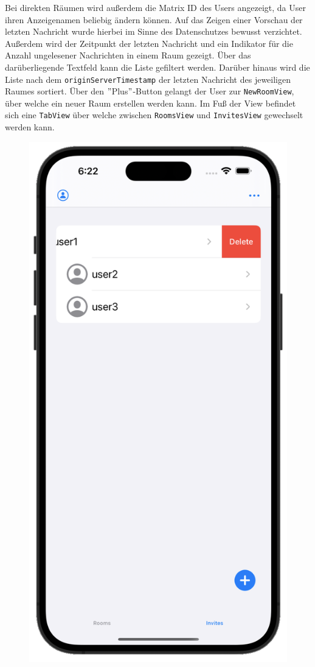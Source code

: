     Bei direkten Räumen wird außerdem die Matrix ID des Users angezeigt, da User ihren Anzeigenamen beliebig ändern können.
    Auf das Zeigen einer Vorschau der letzten Nachricht wurde hierbei im Sinne des Datenschutzes bewusst verzichtet.
    Außerdem wird der Zeitpunkt der letzten Nachricht und ein Indikator für die Anzahl ungelesener Nachrichten in einem Raum gezeigt.
    Über das darüberliegende Textfeld kann die Liste gefiltert werden.
    Darüber hinaus wird die Liste nach dem  \texttt{originServerTimestamp} der letzten Nachricht des jeweiligen Raumes sortiert.
    Über den \("\)Plus\("\)-Button gelangt der User zur \texttt{NewRoomView}, über welche ein neuer Raum erstellen werden kann.
    Im Fuß der View befindet sich eine \texttt{TabView} über welche zwischen \texttt{RoomsView} und \texttt{InvitesView} gewechselt werden kann.
    \begin{figure}[h]
        \includegraphics[scale=0.5]{invites_white}

\end{figure}
